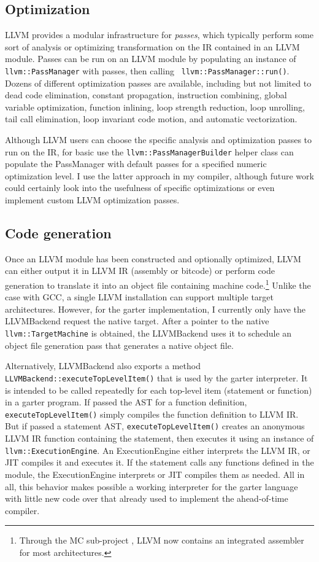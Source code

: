 \documentclass[11pt]{article}
\begin{document}
\subsection{Optimization}

LLVM provides a modular infrastructure for {\em passes}, which typically perform
some sort of analysis or optimizing transformation on the IR contained in an
LLVM module.  Passes can be run on an LLVM module by populating an instance of
{\tt llvm::PassManager} with passes, then calling {\tt
llvm::PassManager::run()}.  Dozens of different optimization passes are
available, including but not limited to dead code elimination, constant propagation, instruction
combining, global variable optimization, function inlining, loop strength
reduction, loop unrolling, tail call elimination, loop invariant code motion,
and automatic vectorization.

Although LLVM users can choose the specific analysis and optimization passes to
run on the IR, for basic use the {\tt llvm::PassManagerBuilder} helper class can
populate the PassManager with default passes for a specified numeric
optimization level.  I use the latter approach in my compiler, although future
work could certainly look into the usefulness of specific optimizations or even
implement custom LLVM optimization passes.

\subsection{Code generation}

Once an LLVM module has been constructed and optionally optimized, LLVM can
either output it in LLVM IR (assembly or bitcode) or perform code generation to
translate it into an object file containing machine code.\footnote{Through the
    MC sub-project \cite{mc}, LLVM now contains an integrated assembler for most
architectures.}  Unlike the case with GCC, a single LLVM installation can
support multiple target architectures.  However, for the garter implementation,
I currently only have the LLVMBackend request the native target.  After a
pointer to the native {\tt llvm::TargetMachine} is obtained, the LLVMBackend
uses it to schedule an object file generation pass that generates a native
object file.

Alternatively, LLVMBackend also exports a method {\tt
LLVMBackend::executeTopLevelItem()} that is used by the garter interpreter.  It
is intended to be called repeatedly for each top-level item (statement or
function) in a garter program.  If passed the AST for a function definition,
{\tt executeTopLevelItem()} simply compiles the
function definition to LLVM IR.  But if passed a statement
AST, {\tt executeTopLevelItem()} creates an anonymous LLVM IR function
containing the statement, then executes it using an instance of {\tt
llvm::ExecutionEngine}.  An ExecutionEngine either interprets the LLVM IR, or
JIT compiles it and executes it.  If the statement calls any functions defined
in the module, the ExecutionEngine interprets or JIT compiles them as needed.
All in all, this behavior makes possible a working interpreter for
the garter language with little new code over that already used to implement the
ahead-of-time compiler.
\end{document}
